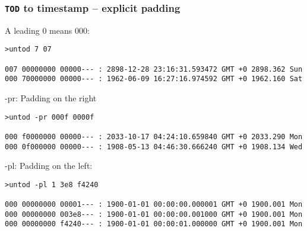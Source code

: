 \documentclass[10pt,xcolor=x11names]{beamer}
\newcommand{\tod}{\texttt{TOD}}
\begin{document}
\begin{frame}[fragile]
  \frametitle{\tod{} to timestamp -- explicit padding}
  \begin{block}{A leading 0 means 000:}
    
  \begin{lstlisting}
>untod 7 07

007 00000000 00000--- : 2898-12-28 23:16:31.593472 GMT +0 2898.362 Sun
000 70000000 00000--- : 1962-06-09 16:27:16.974592 GMT +0 1962.160 Sat
  \end{lstlisting}
  \end{block}
  \begin{block}{-pr: Padding on the right}
    
  \begin{lstlisting}
>untod -pr 000f 0000f

000 f0000000 00000--- : 2033-10-17 04:24:10.659840 GMT +0 2033.290 Mon
000 0f000000 00000--- : 1908-05-13 04:46:30.666240 GMT +0 1908.134 Wed
  \end{lstlisting}
  \end{block}

  \begin{block}{-pl: Padding on the left:}
    
  \begin{lstlisting}
>untod -pl 1 3e8 f4240

000 00000000 00001--- : 1900-01-01 00:00:00.000001 GMT +0 1900.001 Mon
000 00000000 003e8--- : 1900-01-01 00:00:00.001000 GMT +0 1900.001 Mon
000 00000000 f4240--- : 1900-01-01 00:00:01.000000 GMT +0 1900.001 Mon
  \end{lstlisting}
  \end{block}

\end{frame}
\end{document}
